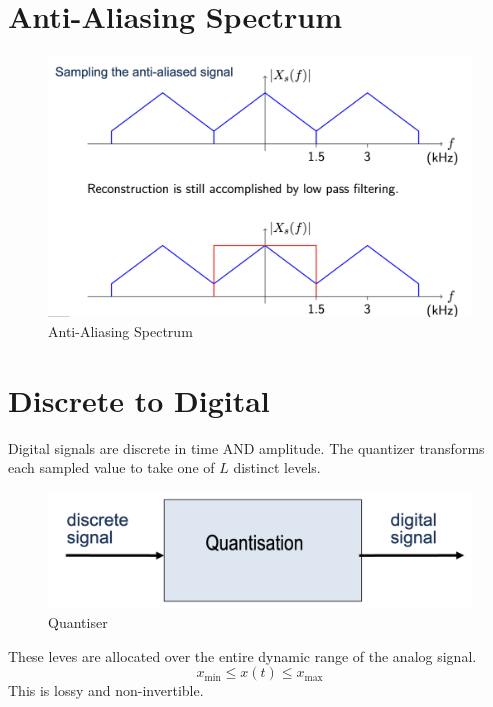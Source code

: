 \documentclass[oneside]{book}
\begin{document}
        \section{Anti-Aliasing Spectrum}
            \begin{figure}[H]
                \centering
                \includegraphics[width=0.5\linewidth]{figures/aa_spectrum.png}
                \caption{Anti-Aliasing Spectrum}
            \end{figure}
        \section{Discrete to Digital}
            Digital signals are discrete in time AND amplitude. The quantizer 
            transforms each sampled value to take one of $L$ distinct levels.
            \begin{figure}[H]
                \centering
                \includegraphics[width=0.5\linewidth]{figures/quantiser.png}
                \caption{Quantiser}
            \end{figure}
            These leves are allocated over the entire dynamic range of the analog
            signal.
            \begin{equation*}
                x_{\text{min}} \leq x(t) \leq x_{\text{max}}
            \end{equation*}
            This is lossy and non-invertible.
\end{document}
